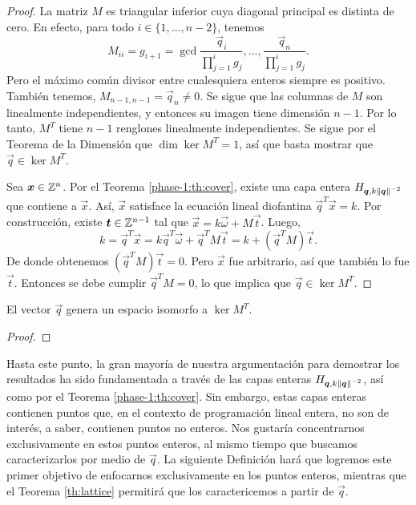 \begin{proof}
	La matriz $M$ es triangular inferior cuya diagonal principal es distinta de cero. En efecto,
	para todo $i \in \lbrace 1, \ldots, n - 2\rbrace$, tenemos
	\begin{equation*}
		M_{ii} = g_{i + 1} = \gcd{\frac{\vec{q}_i}{\prod_{j=1}^{i}g_j}, \ldots,
		\frac{\vec{q}_n}{\prod_{j=1}^{i}g_j}}.
	\end{equation*}
	Pero el máximo común divisor entre cualesquiera enteros siempre es positivo. También tenemos,
	$M_{n-1, n-1} = \vec{q}_n \neq 0$. Se sigue que las columnas de $M$ son linealmente
	independientes, y entonces su imagen tiene dimensión $n - 1$. Por lo tanto, $M^T$ tiene $n - 1$
	renglones linealmente independientes. Se sigue por el Teorema de la Dimensión que $\dim
	\ker{M^T} = 1$, así que basta mostrar que $\vec{q} \in \ker{M^T}$.

	Sea $\boldsymbol{x} \in \mathbb{Z}^n$. Por el Teorema \ref{phase-1:th:cover}, existe una capa entera
	$H_{\boldsymbol{q}, k\left\lVert \boldsymbol{q} \right\rVert^{-2}}$ que contiene a $\vec{x}$. Así, $\vec{x}$ satisface la
	ecuación lineal diofantina $\vec{q}^T\vec{x} = k$. Por construcción, existe $\boldsymbol{t} \in
	\mathbb{Z}^{n-1}$ tal que $\vec{x} = k\vec{\omega} + M\vec{t}$. Luego,
	\begin{equation*}
		k = \vec{q}^T\vec{x} = k \vec{q}^T\vec{\omega} + \vec{q}^TM\vec{t} = k +
		(\vec{q}^TM)\vec{t}.
	\end{equation*}
	De donde obtenemos $(\vec{q}^TM)\vec{t} = 0$. Pero $\vec{x}$ fue arbitrario, así que también lo
	fue $\vec{t}$. Entonces se debe cumplir $\vec{q}^TM = 0$, lo que implica que $\vec{q} \in
	\ker{M^T}$.
\end{proof}
\begin{corollary}
	\label{cor:iso3}
	El vector $\vec{q}$ genera un espacio isomorfo a $\ker{M^T}$.
\end{corollary}
\begin{proof}
\end{proof}

Hasta este punto, la gran mayoría de nuestra argumentación para demostrar los resultados ha sido
fundamentada a través de las capas enteras $H_{\boldsymbol{q}, k\left\lVert \boldsymbol{q} \right\rVert^{-2}}$, así como por el
Teorema \ref{phase-1:th:cover}. Sin embargo, estas capas enteras contienen puntos que, en el
contexto de programación lineal entera, no son de interés, a saber, contienen puntos no enteros. Nos
gustaría concentrarnos exclusivamente en estos puntos enteros, al mismo tiempo que buscamos
caracterizarlos por medio de $\vec{q}$. La siguiente Definición hará que logremos este primer
objetivo de enfocarnos exclusivamente en los puntos enteros, mientras que el Teorema
\ref{th:lattice} permitirá que los caractericemos a partir de $\vec{q}$.

